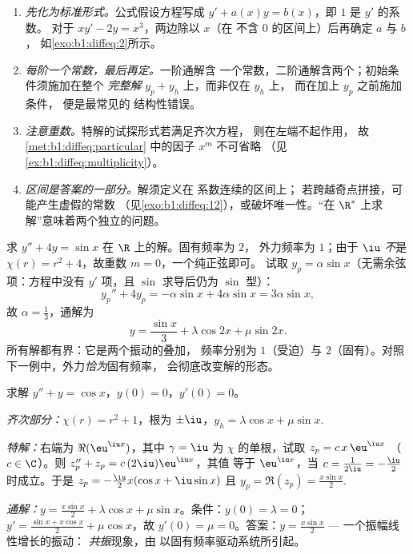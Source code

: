 \begin{remark}[常见误区]\label{rem:b1:diffeq:pitfalls}
\begin{enumerate}
  \item \emph{先化为标准形式。}公式假设方程写成
        $y' + a(x)y = b(x)$，即 $1$ 是 $y'$ 的系数。
        对于 $xy' - 2y = x^3$，两边除以 $x$（在
        不含 $0$ 的区间上）后再确定 $a$ 与 $b$，
        如\cref{exo:b1:diffeq:2}所示。
  \item \emph{每阶一个常数，最后再定。}一阶通解含
        一个常数，二阶通解含两个；初始条件须施加在整个
        \emph{完整解} $y_p + y_h$ 上，而非仅在 $y_h$ 上，
        而在加上 $y_p$ 之前施加条件，
        便是最常见的
        结构性错误。
  \item \emph{注意重数。}特解的试探形式若满足齐次方程，
        则在左端不起作用，
        故 \cref{met:b1:diffeq:particular} 中的因子 $x^m$
        不可省略
        （见\cref{ex:b1:diffeq:multiplicity}）。
  \item \emph{区间是答案的一部分。}解须定义在
        系数连续的区间上；
        若跨越奇点拼接，可能产生虚假的常数
        （见\cref{exo:b1:diffeq:12}），或破坏唯一性。“在
        $\R^*$ 上求解”意味着两个独立的问题。
\end{enumerate}
\end{remark}

\begin{example}[非共振受迫]\label{ex:b1:diffeq:offresonance}
求 $y'' + 4y = \sin x$ 在 $\R$ 上的解。固有频率为 $2$，
外力频率为 $1$；由于 $\iu$ \emph{不}是 $\chi(r) = r^2
+ 4$，故重数 $m = 0$，一个纯正弦即可。
试取 $y_p = \alpha\sin x$（无需余弦项：方程中没有
$y'$ 项，且 $\sin$ 求导后仍为 $\sin$ 型）：
\[
y_p'' + 4y_p = -\alpha\sin x + 4\alpha\sin x = 3\alpha\sin x ,
\]
故 $\alpha = \frac13$，通解为
\[
y = \frac{\sin x}3 + \lambda\cos 2x + \mu\sin 2x .
\]
所有解都有界：它是两个振动的叠加，
频率分别为 $1$（受迫）与 $2$（固有）。对照
下一例中，外力\emph{恰为}固有频率，
会彻底改变解的形态。
\end{example}

\begin{example}[受迫振动]\label{ex:b1:diffeq:oscillation}
求解 $y'' + y = \cos x$，$y(0) = 0$，$y'(0) = 0$。

\emph{齐次部分：}$\chi(r) = r^2 + 1$，根为 $\pm\iu$，$y_h =
\lambda\cos x + \mu \sin x$.

\emph{特解：}右端为 $\Re(\eu^{\iu x})$，其中 $\gamma =
\iu$ 为 $\chi$ 的单根，试取 $z_p = c\, x\, \eu^{\iu x}$
（$c \in \C$）。则 $z_p'' + z_p = c\,(2\iu)\eu^{\iu x}$，其值
等于 $\eu^{\iu x}$，当 $c = \frac{1}{2\iu} = -\frac\iu2$ 时成立。于是 $z_p =
-\frac{\iu}{2} x (\cos x + \iu \sin x)$ 且 $y_p = \Re(z_p) =
\frac{x \sin x}{2}$.

\emph{通解：}$y = \frac{x\sin x}{2} + \lambda\cos x +
\mu\sin x$。条件：$y(0) = \lambda = 0$；$y' = \frac{\sin x +
x\cos x}{2} + \mu\cos x$，故 $y'(0) = \mu = 0$。答案：$y =
\frac{x\sin x}{2}$ --- 一个振幅线性增长的振动：
\emph{共振}现象，由
以固有频率驱动系统所引起。
\end{example}

